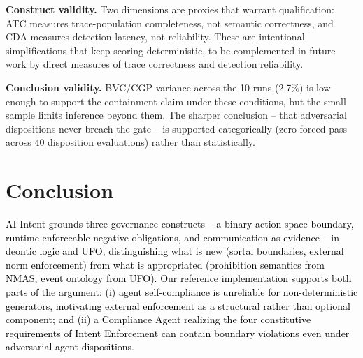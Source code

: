 \documentclass[runningheads]{llncs}
\begin{document}
\textbf{Construct validity.} Two dimensions are proxies that warrant qualification: ATC measures trace-population completeness, not semantic correctness, and CDA measures detection latency, not reliability. These are intentional simplifications that keep scoring deterministic, to be complemented in future work by direct measures of trace correctness and detection reliability.

\textbf{Conclusion validity.} BVC/CGP variance across the 10 runs (2.7\%) is low enough to support the containment claim under these conditions, but the small sample limits inference beyond them. 
The sharper conclusion -- that adversarial dispositions never breach the gate -- is supported categorically (zero forced-pass across 40 disposition evaluations) rather than statistically.

\section{Conclusion}
\label{sec:conclusion}

\textcolor{black}{AI-Intent grounds three governance constructs -- a binary action-space boundary, runtime-enforceable negative obligations, and communication-as-evidence -- in deontic logic and UFO, distinguishing what is new (sortal boundaries, external norm enforcement) from what is appropriated (prohibition semantics from NMAS, event ontology from UFO). 
Our reference implementation supports both parts of the argument: (i) agent self-compliance is unreliable for non-deterministic generators, motivating external enforcement as a structural rather than optional component; and (ii) a Compliance Agent realizing the four constitutive requirements of Intent Enforcement can contain boundary violations even under adversarial agent dispositions.}
\end{document}

